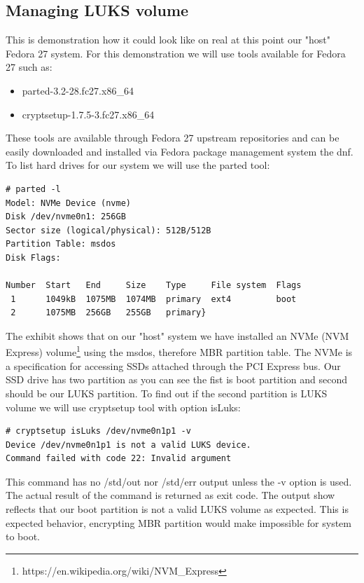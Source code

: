 \subsection{Managing LUKS volume}

This is demonstration how it could look like on real at this point our "host" Fedora 27 system.
For this demonstration we will use tools available for Fedora 27 such as:\\
\begin{itemize}
    \item parted-3.2-28.fc27.x86\_64
    \item cryptsetup-1.7.5-3.fc27.x86\_64
\end{itemize}
These tools are available through Fedora 27 upstream repositories and can be easily downloaded and installed via Fedora package management system the dnf.
To list hard drives for our system we will use the parted tool:
\begin{lstlisting}[columns=fixed,basicstyle=\ttfamily\footnotesize,tabsize=4,backgroundcolor=\color{yellow!10}]
# parted -l
Model: NVMe Device (nvme)
Disk /dev/nvme0n1: 256GB
Sector size (logical/physical): 512B/512B
Partition Table: msdos
Disk Flags:

Number  Start   End     Size    Type     File system  Flags
 1      1049kB  1075MB  1074MB  primary  ext4         boot
 2      1075MB  256GB   255GB   primary}
\end{lstlisting}
The exhibit shows that on our "host" system we have installed an NVMe (NVM Express) volume\footnote{https://en.wikipedia.org/wiki/NVM\_Express} using the msdos, therefore MBR partition table.
The NVMe is a specification for accessing SSDs attached through the PCI Express bus.
Our SSD drive has two partition as you can see the fist is boot partition and second should be our LUKS partition.
To find out if the second partition is LUKS volume we will use cryptsetup tool with option isLuks:
\begin{lstlisting}[columns=fixed,basicstyle=\ttfamily\footnotesize,tabsize=4,backgroundcolor=\color{yellow!10}]
# cryptsetup isLuks /dev/nvme0n1p1 -v
Device /dev/nvme0n1p1 is not a valid LUKS device.
Command failed with code 22: Invalid argument
\end{lstlisting}
This command has no /std/out nor /std/err output unless the -v option is used.
The actual result of the command is returned as exit code.
The output show reflects that our boot partition is not a valid LUKS volume as expected.
This is expected behavior, encrypting MBR partition would make impossible for system to boot.
